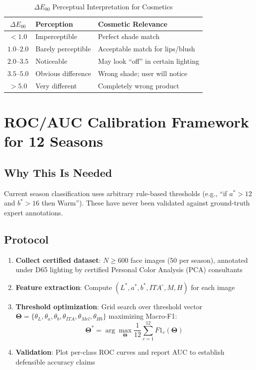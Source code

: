 \documentclass[12pt,a4paper]{article}
\begin{document}
\begin{table}[H]
\centering
\caption{$\Delta E_{00}$ Perceptual Interpretation for Cosmetics}
\begin{tabular}{@{}c l l@{}}
\toprule
$\Delta E_{00}$ & \textbf{Perception} & \textbf{Cosmetic Relevance} \\
\midrule
$< 1.0$ & Imperceptible & Perfect shade match \\
$1.0$--$2.0$ & Barely perceptible & Acceptable match for lips/blush \\
$2.0$--$3.5$ & Noticeable & May look ``off'' in certain lighting \\
$3.5$--$5.0$ & Obvious difference & Wrong shade; user will notice \\
$> 5.0$ & Very different & Completely wrong product \\
\bottomrule
\end{tabular}
\end{table}


\section{ROC/AUC Calibration Framework for 12 Seasons}
\label{sec:calibration}

\subsection{Why This Is Needed}
Current season classification uses arbitrary rule-based thresholds (e.g., ``if $a^* > 12$ and $b^* > 16$ then Warm''). These have never been validated against ground-truth expert annotations.

\subsection{Protocol}
\begin{enumerate}
    \item \textbf{Collect certified dataset}: $N \geq 600$ face images (50 per season), annotated under D65 lighting by certified Personal Color Analysis (PCA) consultants
    \item \textbf{Feature extraction}: Compute $(L^*, a^*, b^*, ITA^{\circ}, M, H)$ for each image
    \item \textbf{Threshold optimization}: Grid search over threshold vector $\mathbf{\Theta} = \{\theta_L, \theta_a, \theta_b, \theta_{ITA}, \theta_{Mel}, \theta_{Hb}\}$ maximizing Macro-F1:
    \begin{equation}
    \mathbf{\Theta}^* = \arg\max_{\mathbf{\Theta}} \frac{1}{12} \sum_{c=1}^{12} F1_c(\mathbf{\Theta})
    \end{equation}
    \item \textbf{Validation}: Plot per-class ROC curves and report AUC to establish defensible accuracy claims
\end{enumerate}
\end{document}

